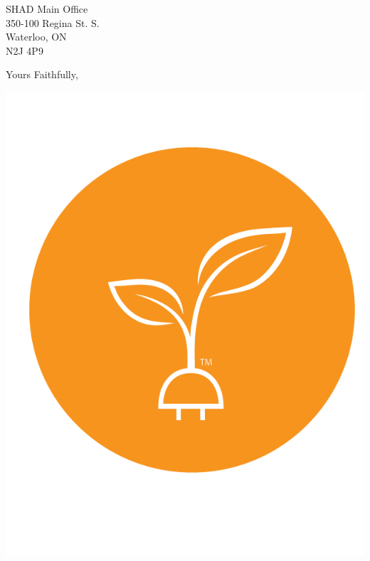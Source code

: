 \documentclass[]{letter}
\begin{document}
\begin{letter}{SHAD Main Office \\ 350-100 Regina St. S. \\ Waterloo, ON \\ N2J 4P9}
		\closing{Yours Faithfully,}
		\begin{center}
			\includegraphics[scale=0.3]{logo.png}
		\end{center}
		
	\end{letter}
	
\end{document}
